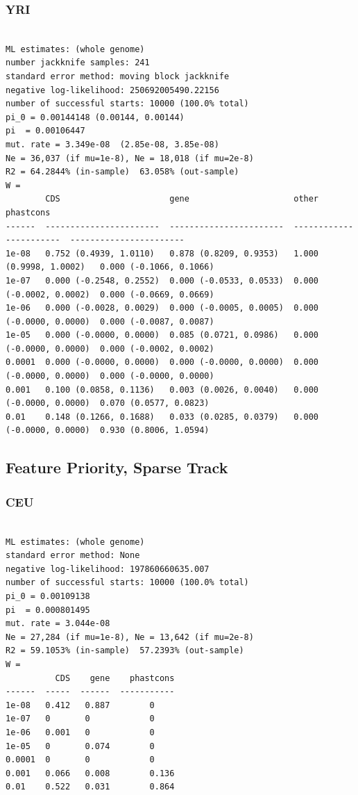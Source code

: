 \documentclass[11pt]{article}
\begin{document}
\subsubsection*{YRI}
\begin{minipage}{\linewidth}\begin{footnotesize}
\begin{verbatim}

ML estimates: (whole genome)
number jackknife samples: 241
standard error method: moving block jackknife
negative log-likelihood: 250692005490.22156
number of successful starts: 10000 (100.0% total)
pi_0 = 0.00144148 (0.00144, 0.00144)
pi  = 0.00106447
mut. rate = 3.349e-08  (2.85e-08, 3.85e-08)
Ne = 36,037 (if mu=1e-8), Ne = 18,018 (if mu=2e-8)
R2 = 64.2844% (in-sample)  63.058% (out-sample)
W = 
        CDS                      gene                     other                    phastcons
------  -----------------------  -----------------------  -----------------------  -----------------------
1e-08   0.752 (0.4939, 1.0110)   0.878 (0.8209, 0.9353)   1.000 (0.9998, 1.0002)   0.000 (-0.1066, 0.1066)
1e-07   0.000 (-0.2548, 0.2552)  0.000 (-0.0533, 0.0533)  0.000 (-0.0002, 0.0002)  0.000 (-0.0669, 0.0669)
1e-06   0.000 (-0.0028, 0.0029)  0.000 (-0.0005, 0.0005)  0.000 (-0.0000, 0.0000)  0.000 (-0.0087, 0.0087)
1e-05   0.000 (-0.0000, 0.0000)  0.085 (0.0721, 0.0986)   0.000 (-0.0000, 0.0000)  0.000 (-0.0002, 0.0002)
0.0001  0.000 (-0.0000, 0.0000)  0.000 (-0.0000, 0.0000)  0.000 (-0.0000, 0.0000)  0.000 (-0.0000, 0.0000)
0.001   0.100 (0.0858, 0.1136)   0.003 (0.0026, 0.0040)   0.000 (-0.0000, 0.0000)  0.070 (0.0577, 0.0823)
0.01    0.148 (0.1266, 0.1688)   0.033 (0.0285, 0.0379)   0.000 (-0.0000, 0.0000)  0.930 (0.8006, 1.0594)
\end{verbatim}
\end{footnotesize}\end{minipage}


\subsection{Feature Priority, Sparse Track}
\subsubsection*{CEU}
\begin{minipage}{\linewidth}\begin{footnotesize}
\begin{verbatim}

ML estimates: (whole genome)
standard error method: None
negative log-likelihood: 197860660635.007
number of successful starts: 10000 (100.0% total)
pi_0 = 0.00109138
pi  = 0.000801495
mut. rate = 3.044e-08 
Ne = 27,284 (if mu=1e-8), Ne = 13,642 (if mu=2e-8)
R2 = 59.1053% (in-sample)  57.2393% (out-sample)
W = 
          CDS    gene    phastcons
------  -----  ------  -----------
1e-08   0.412   0.887        0
1e-07   0       0            0
1e-06   0.001   0            0
1e-05   0       0.074        0
0.0001  0       0            0
0.001   0.066   0.008        0.136
0.01    0.522   0.031        0.864
\end{verbatim}
\end{footnotesize}\end{minipage}
\end{document}

